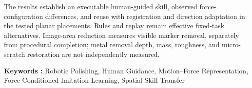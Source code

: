 The results establish an executable human-guided skill, observed force-configuration differences, and reuse with registration and direction adaptation in the tested planar placements. Rules and replay remain effective fixed-task alternatives. Image-area reduction measures visible marker removal, separately from procedural completion; metal removal depth, mass, roughness, and micro-scratch restoration are not independently measured.

\vspace{.3cm}
\noindent\textbf{Keywords :} Robotic Polishing, Human Guidance, Motion--Force Representation, Force-Conditioned Imitation Learning, Spatial Skill Transfer
